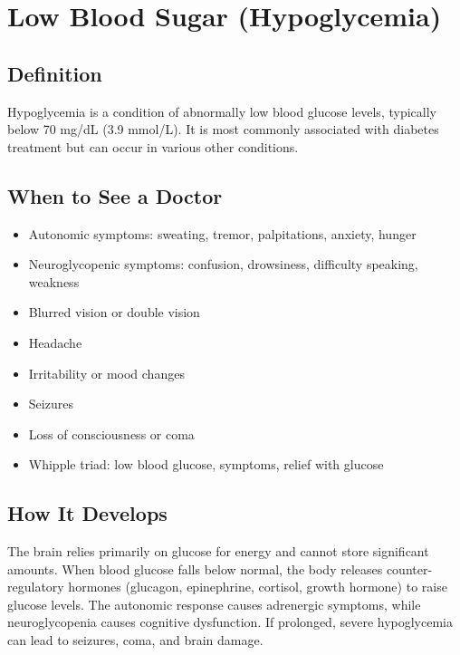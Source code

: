 \chapter{Low Blood Sugar (Hypoglycemia)}

\section*{Definition}
Hypoglycemia is a condition of abnormally low blood glucose levels, typically below 70 mg/dL (3.9 mmol/L). It is most commonly associated with diabetes treatment but can occur in various other conditions.

\section*{When to See a Doctor}
\begin{itemize}
\item Autonomic symptoms: sweating, tremor, palpitations, anxiety, hunger
\item Neuroglycopenic symptoms: confusion, drowsiness, difficulty speaking, weakness
\item Blurred vision or double vision
\item Headache
\item Irritability or mood changes
\item Seizures
\item Loss of consciousness or coma
\item Whipple triad: low blood glucose, symptoms, relief with glucose
\end{itemize}

\section*{How It Develops}
The brain relies primarily on glucose for energy and cannot store significant amounts. When blood glucose falls below normal, the body releases counter-regulatory hormones (glucagon, epinephrine, cortisol, growth hormone) to raise glucose levels. The autonomic response causes adrenergic symptoms, while neuroglycopenia causes cognitive dysfunction. If prolonged, severe hypoglycemia can lead to seizures, coma, and brain damage.

